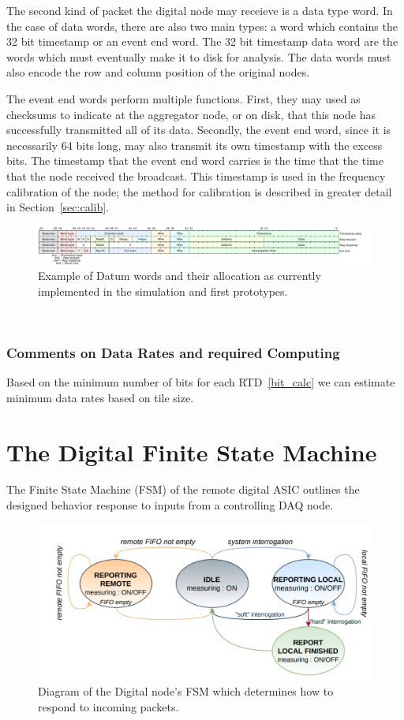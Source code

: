 The second kind of packet the digital node may receieve is a data type word.
In the case of data words, there are also two main types: a word which contains the 32 bit timestamp or an event end word.
The 32 bit timestamp data word are the words which must eventually make it to disk for analysis.
The data words must also encode the row and column position of the original nodes.

The event end words perform multiple functions.
First, they may used as checksums to indicate at the aggregator node, or on disk, that this node has successfully transmitted all of its data.
Secondly, the event end word, since it is necessarily 64 bits long, may also transmit its own timestamp with the excess bits.
The timestamp that the event end word carries is the time that the time that the node received the broadcast.
This timestamp is used in the frequency calibration of the node; the method for calibration is described in greater detail in Section~\ref{sec:calib}.


\begin{figure}[]
\centering
\includegraphics[width=\textwidth]{images/qpix_word_format.pdf}
\caption{Example of Datum words and their allocation as currently implemented in the simulation and first prototypes.}
\end{figure}~\label{fig:datum}

\subsubsection{Comments on Data Rates and required Computing}

Based on the minimum number of bits for each RTD~\ref{bit_calc} we can estimate minimum data rates based on tile size.


\section{The Digital Finite State Machine}

The Finite State Machine (FSM) of the remote digital ASIC outlines the designed behavior response to inputs from a controlling DAQ node.

\begin{figure}[]
\centering
\includegraphics[width=\textwidth]{images/digital_fsm_overview.jpg}
\caption{Diagram of the Digital node's FSM which determines how to respond to incoming packets.}
\end{figure}

